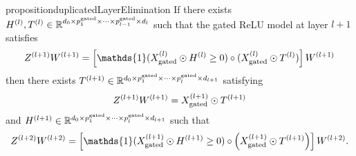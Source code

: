 \begin{restatable}{proposition}{duplicatedLayerElimination}%
    \label{prop:duplicated-layer-elimination}
    If there exists
    \( H^{(l)}, T^{(l)} \in
    \mathbb{R}^{d_0 \times p_1^{\text{gated}} \times \cdots \times p_{l-1}^{\text{gated}} \times d_{l}} \)
    such that the gated ReLU model at layer \( l+1 \) satisfies
    \begin{equation}\label{eq:duplicated-layer-to-tensorize}
        \Zll \Wll =
        \sbr{\mathds{1}(\tXl \odot H^{(l)} \geq 0) \circ
            (\tXl \odot \Tl)} \Wll
    \end{equation}
    then there exists
    \( T^{(l+1)} \in \mathbb{R}^{d_0 \times p_1^{\text{gated}} \times \cdots \times p_{l}^{\text{gated}} \times d_{l+1}} \)
    satisfying
    \[
        Z^{(l+1)} W^{(l+1)} = X^{(l+1)}_{\text{gated}} \odot T^{(l+1)}
    \]
    and
    \( H^{(l+1)} \in \mathbb{R}^{d_0 \times p_1^{\text{gated}} \times \cdots \times p_{l}^{\text{gated}} \times d_{l+1}} \)
    such that
    \[
        Z^{(l+2)} W^{(l+2)}
        = \sbr{\mathds{1}(\tXll \odot H^{(l+1)} \geq 0) \circ \rbr{\tXll \odot \Tll}} W^{(l+2)}.
    \]
\end{restatable}

